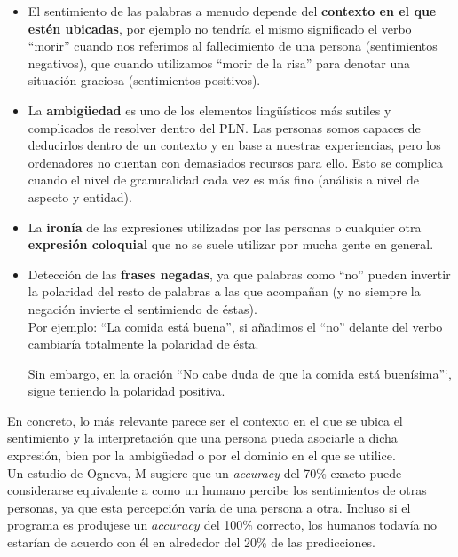\documentclass[a4paper,12pt]{report}
\begin{document}
\begin{itemize}
\item El sentimiento de las palabras a menudo depende del \textbf{contexto en el que estén ubicadas}, por ejemplo no tendría el mismo significado el verbo ``morir'' cuando nos referimos al fallecimiento de una persona (sentimientos negativos), que cuando utilizamos ``morir de la risa'' para denotar una situación graciosa (sentimientos positivos).

\item La \textbf{ambigüedad} es uno de los elementos lingüísticos más sutiles y complicados de resolver dentro del PLN. Las personas somos capaces de deducirlos dentro de un contexto y en base a nuestras experiencias, pero los ordenadores no cuentan con demasiados recursos para ello. Esto se complica cuando el nivel de granuralidad cada vez es más fino (análisis a nivel de aspecto y entidad).

\item  La \textbf{ironía} de las expresiones utilizadas por las personas o cualquier otra \textbf{expresión coloquial} que no se suele utilizar por mucha gente en general. 

\item Detección de las \textbf{frases negadas}, ya que palabras como ``no'' pueden invertir la polaridad del resto de palabras a las que acompañan (y no siempre la negación invierte el sentimiendo de éstas). 
\vspace{2mm}\\
Por ejemplo: ``La comida está buena'', si añadimos el ``no'' delante del verbo cambiaría totalmente la polaridad de ésta. 

Sin embargo, en la oración ``No cabe duda de que la comida está buenísima''`, sigue teniendo la polaridad positiva.

\end{itemize}

{\setlength{\parindent}{0cm}
En concreto, lo más relevante parece ser el contexto en el que se ubica el sentimiento y la interpretación que una persona pueda asociarle a dicha expresión, bien por la ambigüedad o por el dominio en el que se utilice.}
\vspace{2mm}\\
{\setlength{\parindent}{0cm}
Un estudio de Ogneva, M \cite{OGNEVA} sugiere que un \textit{accuracy} del 70\% exacto puede considerarse equivalente a como un humano percibe los sentimientos de otras personas, ya que esta percepción varía de una persona a otra. Incluso si el programa es produjese un $accuracy$ del 100\% correcto, los humanos
todavía no estarían de acuerdo con él en alrededor del 20\% de las predicciones.}
\end{document}
